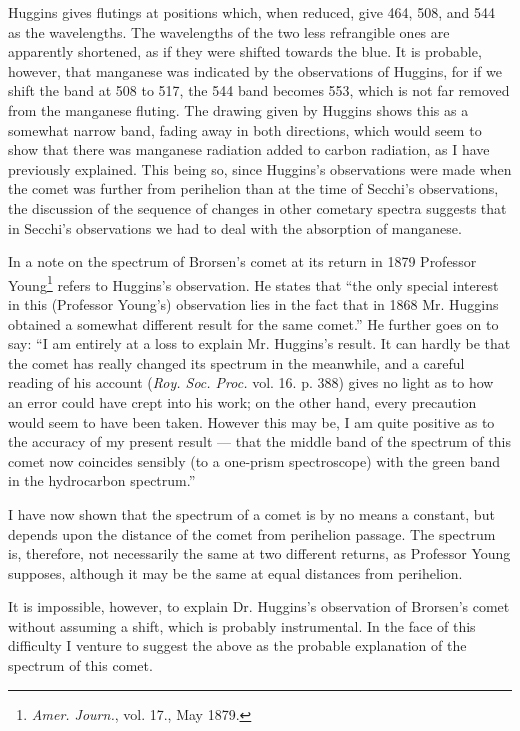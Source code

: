 \documentclass[a4paper, 12pt, oneside, polutonikogreek, english]{article}
\begin{document}
Huggins gives flutings at positions which, when reduced, give 464, 508, and 544 as the wavelengths. The wavelengths of the two less refrangible ones are apparently shortened, as if they were shifted towards the blue. It is probable, however, that manganese was indicated by the observations of Huggins, for if we shift the band at 508 to 517, the 544 band becomes 553, which is not far removed from the manganese fluting. The drawing given by Huggins shows this as a somewhat narrow band, fading away in both directions, which would seem to show that there was manganese radiation added to carbon radiation, as I have previously explained. This being so, since Huggins's observations were made when the comet was further from perihelion than at the time of Secchi's observations, the discussion of the sequence of changes in other cometary spectra suggests that in Secchi's observations we had to deal with the absorption of manganese.

In a note on the spectrum of Brorsen's comet at its return in 1879 Professor Young\footnote{\emph{Amer. Journ.}, vol. 17., May 1879.} refers to Huggins's observation. He states that ``the only special interest in this (Professor Young's) observation lies in the fact that in 1868 Mr. Huggins obtained a somewhat different result for the same comet.'' He further goes on to say: ``I am entirely at a loss to explain Mr. Huggins's result. It can hardly be that the comet has really changed its spectrum in the meanwhile, and a careful reading of his account (\emph{Roy. Soc. Proc.} vol. 16. p. 388) gives no light as to how an error could have crept into his work; on the other hand, every precaution would seem to have been taken. However this may be, I am quite positive as to the accuracy of my present result --- that the middle band of the spectrum of this comet now coincides sensibly (to a one-prism spectroscope) with the green band in the hydrocarbon spectrum.''

I have now shown that the spectrum of a comet is by no means a constant, but depends upon the distance of the comet from perihelion passage. The spectrum is, therefore, not necessarily the same at two different returns, as Professor Young supposes, although it may be the same at equal distances from perihelion.

It is impossible, however, to explain Dr. Huggins's observation of Brorsen's comet without assuming a shift, which is probably instrumental. In the face of this difficulty I venture to suggest the above as the probable explanation of the spectrum of this comet.
\end{document}
